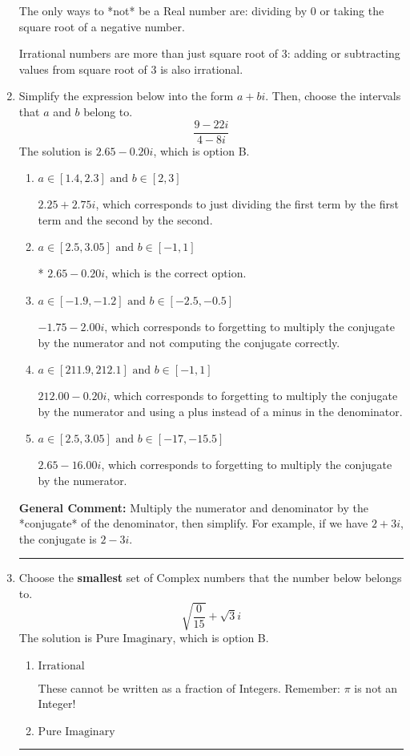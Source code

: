 \documentclass{extbook}[14pt]
\newcommand{\litem}[1]{\item #1

\rule{\textwidth}{0.4pt}}
\begin{document}
\begin{enumerate}
{ The only ways to *not* be a Real number are: dividing by 0 or taking the square root of a negative number. 
 
 Irrational numbers are more than just square root of 3: adding or subtracting values from square root of 3 is also irrational.
}
\litem{
Simplify the expression below into the form $a+bi$. Then, choose the intervals that $a$ and $b$ belong to.
\[ \frac{9 - 22 i}{4 - 8 i} \]The solution is \( 2.65  - 0.20 i \), which is option B.\begin{enumerate}[label=\Alph*.]
\item \( a \in [1.4, 2.3] \text{ and } b \in [2, 3] \)

 $2.25  + 2.75 i$, which corresponds to just dividing the first term by the first term and the second by the second.
\item \( a \in [2.5, 3.05] \text{ and } b \in [-1, 1] \)

* $2.65  - 0.20 i$, which is the correct option.
\item \( a \in [-1.9, -1.2] \text{ and } b \in [-2.5, -0.5] \)

 $-1.75  - 2.00 i$, which corresponds to forgetting to multiply the conjugate by the numerator and not computing the conjugate correctly.
\item \( a \in [211.9, 212.1] \text{ and } b \in [-1, 1] \)

 $212.00  - 0.20 i$, which corresponds to forgetting to multiply the conjugate by the numerator and using a plus instead of a minus in the denominator.
\item \( a \in [2.5, 3.05] \text{ and } b \in [-17, -15.5] \)

 $2.65  - 16.00 i$, which corresponds to forgetting to multiply the conjugate by the numerator.
\end{enumerate}

\textbf{General Comment:} Multiply the numerator and denominator by the *conjugate* of the denominator, then simplify. For example, if we have $2+3i$, the conjugate is $2-3i$.
}
\litem{
Choose the \textbf{smallest} set of Complex numbers that the number below belongs to.
\[ \sqrt{\frac{0}{15}}+\sqrt{3}i \]The solution is \( \text{Pure Imaginary} \), which is option B.\begin{enumerate}[label=\Alph*.]
\item \( \text{Irrational} \)

These cannot be written as a fraction of Integers. Remember: $\pi$ is not an Integer!
\item \( \text{Pure Imaginary} \)


\end{enumerate}}
\end{enumerate}
\end{document}
